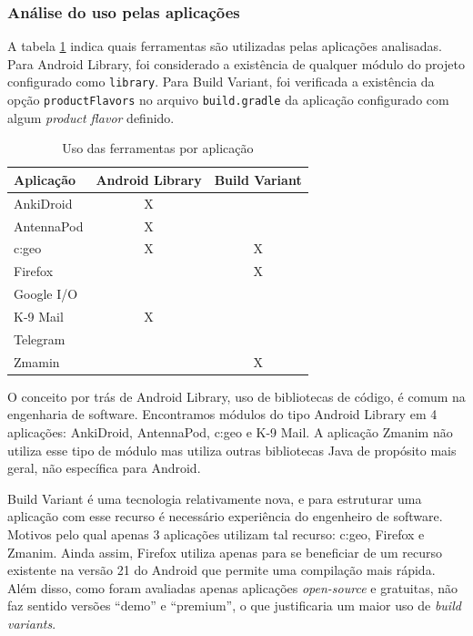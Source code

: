 \subsubsection{Análise do uso pelas aplicações}
A tabela \ref{tab:uso_ferramentas} indica quais ferramentas são utilizadas pelas
aplicações analisadas. Para Android Library, foi considerado a existência de qualquer
módulo do projeto configurado como \texttt{library}. Para Build Variant, foi verificada a
existência da opção \texttt{productFlavors} no arquivo \texttt{build.gradle} da
aplicação configurado com algum \textit{product flavor} definido.

\begin{table}[ht]
\centeringx
\caption{Uso das ferramentas por aplicação}
\label{tab:uso_ferramentas}
\begin{tabular}{|l|c|c|}
\hline
\textbf{Aplicação} & \textbf{Android Library} & \textbf{Build Variant} \\ \hline
AnkiDroid          & X                        &                        \\ \hline
AntennaPod         & X                        &                        \\ \hline
c:geo              & X                        & X                      \\ \hline
Firefox            &                          & X                      \\ \hline
Google I/O         &                          &                        \\ \hline
K-9 Mail           & X                        &                        \\ \hline
Telegram           &                          &                        \\ \hline
Zmamin             &                          & X                      \\ \hline
\end{tabular}
\end{table}

O conceito por trás de Android Library, uso de bibliotecas de código, é comum na
engenharia de software. Encontramos módulos do tipo Android Library em 4 aplicações:
AnkiDroid, AntennaPod, c:geo e K-9 Mail.
A aplicação Zmanim não utiliza esse tipo de módulo mas utiliza outras bibliotecas
Java de propósito mais geral, não específica para Android.

Build Variant é uma tecnologia relativamente nova, e para estruturar uma aplicação
com esse recurso é necessário experiência do engenheiro de software. Motivos pelo
qual apenas 3 aplicações utilizam tal recurso: c:geo, Firefox e Zmanim.
Ainda assim, Firefox utiliza apenas
para se beneficiar de um recurso existente na versão 21 do Android que permite
uma compilação mais rápida. Além disso, como foram avaliadas apenas aplicações
\textit{open-source} e gratuitas, não faz sentido versões “demo” e “premium”,
o que justificaria um maior uso de \textit{build variants}.


